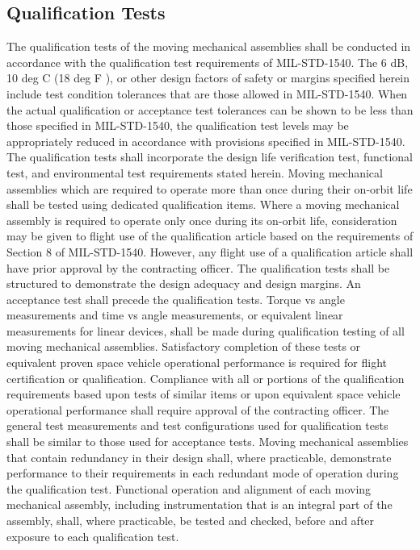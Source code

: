 \documentclass[12pt]{article}
\begin{document}
\subsection{Qualification Tests} %
The qualification tests of the moving mechanical assemblies shall be conducted in accordance with the qualification test requirements of MIL-STD-1540. 
The 6 dB, 10 deg C (18 deg F ), or other design factors of safety or margins specified herein include test condition tolerances that are those allowed in MIL-STD-1540. 
When the actual qualification or acceptance test tolerances can be shown to be less than those specified in MIL-STD-1540, the qualification test levels may be appropriately reduced in accordance with provisions specified in MIL-STD-1540. 
The qualification tests shall incorporate the design life verification test, functional test, and environmental test requirements stated herein. 
Moving mechanical assemblies which are required to operate more than once during their on-orbit life shall be tested using dedicated qualification items. 
Where a moving mechanical assembly is required to operate only once during its on-orbit life, consideration may be given to flight use of the qualification article based on the requirements of Section 8 of MIL-STD-1540. 
However, any flight use of a qualification article shall have prior approval by the contracting officer. 
The qualification tests shall be structured to demonstrate the design adequacy and design margins. 
An acceptance test shall precede the qualification tests. 
Torque vs angle measurements and time vs angle measurements, or equivalent linear measurements for linear devices, shall be made during qualification testing of all moving mechanical assemblies.
Satisfactory completion of these tests or equivalent proven space vehicle operational performance is required for flight certification or qualification. 
Compliance with all or portions of the qualification requirements based upon tests of similar items or upon equivalent space vehicle operational performance shall require approval of the contracting officer. 
The general test measurements and test configurations used for qualification tests shall be similar to those used for acceptance tests.
Moving mechanical assemblies that contain redundancy in their design shall, where practicable, demonstrate performance to their requirements in each redundant mode of operation during the qualification test. 
Functional operation and alignment of each moving mechanical assembly, including instrumentation that is an integral part of the assembly, shall, where practicable, be tested and checked, before and after exposure to each qualification test.
\end{document}
